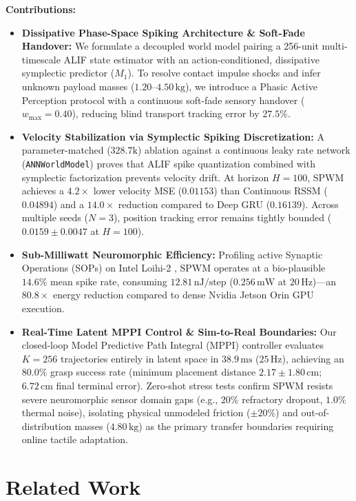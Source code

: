 \documentclass{article}
\begin{document}
\textbf{Contributions:}
\begin{itemize}
    \item \textbf{Dissipative Phase-Space Spiking Architecture \& Soft-Fade Handover:} We formulate a decoupled world model pairing a 256-unit multi-timescale ALIF state estimator with an action-conditioned, dissipative symplectic predictor ($M_1$). To resolve contact impulse shocks and infer unknown payload masses ($1.20$--$4.50\,\text{kg}$), we introduce a Phasic Active Perception protocol with a continuous soft-fade sensory handover ($w_{\text{max}} = 0.40$), reducing blind transport tracking error by $27.5\%$.
    \item \textbf{Velocity Stabilization via Symplectic Spiking Discretization:} A parameter-matched ($328.7\text{k}$) ablation against a continuous leaky rate network (\texttt{ANNWorldModel}) proves that ALIF spike quantization combined with symplectic factorization prevents velocity drift. At horizon $H=100$, SPWM achieves a $4.2\times$ lower velocity MSE ($0.01153$) than Continuous RSSM ($0.04894$) and a $14.0\times$ reduction compared to Deep GRU ($0.16139$). Across multiple seeds ($N=3$), position tracking error remains tightly bounded ($0.0159 \pm 0.0047$ at $H=100$).
    \item \textbf{Sub-Milliwatt Neuromorphic Efficiency:} Profiling active Synaptic Operations (SOPs) on Intel Loihi-2 \cite{davies2018loihi, orchad2021loihi2}, SPWM operates at a bio-plausible $14.6\%$ mean spike rate, consuming $12.81\,\text{nJ/step}$ ($0.256\,\text{mW}$ at $20\,\text{Hz}$)—an $80.8\times$ energy reduction compared to dense Nvidia Jetson Orin GPU execution.
    \item \textbf{Real-Time Latent MPPI Control \& Sim-to-Real Boundaries:} Our closed-loop Model Predictive Path Integral (MPPI) \cite{williams2017information} controller evaluates $K=256$ trajectories entirely in latent space in $38.9\,\text{ms}$ ($25\,\text{Hz}$), achieving an $80.0\%$ grasp success rate (minimum placement distance $2.17 \pm 1.80\,\text{cm}$; $6.72\,\text{cm}$ final terminal error). Zero-shot stress tests confirm SPWM resists severe neuromorphic sensor domain gaps (e.g., $20\%$ refractory dropout, $1.0\%$ thermal noise), isolating physical unmodeled friction ($\pm 20\%$) and out-of-distribution masses ($4.80\,\text{kg}$) as the primary transfer boundaries requiring online tactile adaptation.
\end{itemize}

\section{Related Work}
\end{document}
